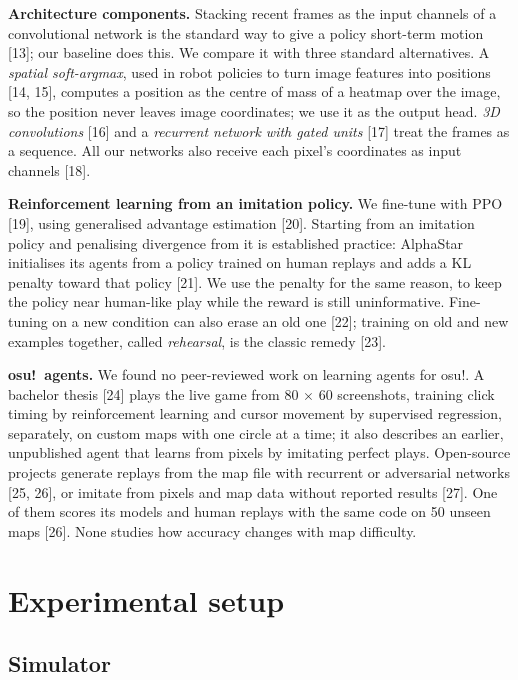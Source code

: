 \documentclass[10pt,a4paper]{article}
\begin{document}
\textbf{Architecture components.} Stacking recent frames as the input channels of a convolutional network is the standard way to give a policy short-term motion [13]; our baseline does this. We compare it with three standard alternatives. A \textit{spatial soft-argmax}, used in robot policies to turn image features into positions [14, 15], computes a position as the centre of mass of a heatmap over the image, so the position never leaves image coordinates; we use it as the output head. \textit{3D convolutions} [16] and a \textit{recurrent network with gated units} [17] treat the frames as a sequence. All our networks also receive each pixel's coordinates as input channels [18].


\textbf{Reinforcement learning from an imitation policy.} We fine-tune with PPO [19], using generalised advantage estimation [20]. Starting from an imitation policy and penalising divergence from it is established practice: AlphaStar initialises its agents from a policy trained on human replays and adds a KL penalty toward that policy [21]. We use the penalty for the same reason, to keep the policy near human-like play while the reward is still uninformative. Fine-tuning on a new condition can also erase an old one [22]; training on old and new examples together, called \textit{rehearsal}, is the classic remedy [23].


\textbf{osu!\ agents.} We found no peer-reviewed work on learning agents for osu!. A bachelor thesis [24] plays the live game from 80 $\times$ 60 screenshots, training click timing by reinforcement learning and cursor movement by supervised regression, separately, on custom maps with one circle at a time; it also describes an earlier, unpublished agent that learns from pixels by imitating perfect plays. Open-source projects generate replays from the map file with recurrent or adversarial networks [25, 26], or imitate from pixels and map data without reported results [27]. One of them scores its models and human replays with the same code on 50 unseen maps [26]. None studies how accuracy changes with map difficulty.


\section{Experimental setup}

\subsection{Simulator}
\end{document}
